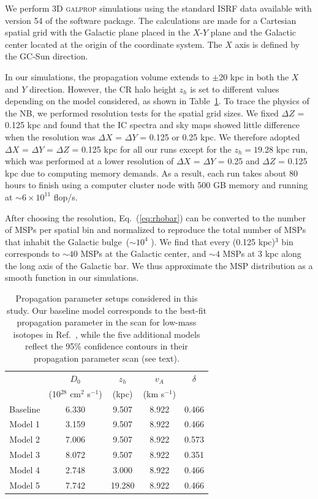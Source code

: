 \documentclass[doublespace,nopageskip]{VTthesis} %
\begin{document}
We perform 3D \textsc{galprop} simulations using the standard ISRF data available with version 54 of the software package. The calculations are made for a Cartesian spatial grid with the Galactic plane placed in the $X$-$Y$ plane and the Galactic center located at the origin of the coordinate system. The $X$ axis is defined by the GC-Sun direction.

In our simulations, the propagation volume extends to $\pm$20 kpc in both the $X$ and $Y$ direction. However, the CR halo height $z_h$ is set to different values depending on the model considered, as shown in Table~\ref{tab:dpara}. To trace the physics of the NB, we performed resolution tests for the spatial grid sizes. We fixed $\Delta Z$ = 0.125 kpc and found that the IC spectra and sky maps showed little difference when the resolution was $\Delta X$ = $\Delta Y$ = 0.125 or 0.25 kpc. We therefore adopted $\Delta X$ = $\Delta Y$ = $\Delta Z$ = 0.125 kpc for all our runs except for the $z_h = 19.28$ kpc run, which was performed at a lower resolution of $\Delta X$ = $\Delta Y$ = 0.25 and $\Delta Z$ = 0.125 kpc due to computing memory demands. As a result, each run takes about 80 hours to finish using a computer cluster node with 500 GB memory and running at $\sim 6 \times 10^{11}$ flop/s.

After choosing the resolution, Eq.~(\ref{eq:rhobar}) can be converted to the number of MSPs per spatial bin and normalized to reproduce the total number of MSPs that inhabit the Galactic bulge~($\sim 10^4$ \cite{2018ApJ...863..199G}). We find that every (0.125 kpc)$^3$ bin corresponds to $\sim 40$ MSPs at the Galactic center, and $\sim 4$ MSPs at 3 kpc along the long axis of the Galactic bar. We thus approximate the MSP distribution as a smooth function in our simulations.

\begin{table}[htb]
  \centering
  \caption{Propagation parameter setups considered in this study. Our baseline model corresponds to the best-fit propagation parameter in the scan for low-mass isotopes in Ref.~\cite{2016ApJ...824...16J}, while the five additional models reflect the 95\% confidence contours in their propagation parameter scan \cite{2016ApJ...824...16J} (see text).}
    \begin{tabular}{ c c c c c }
    \toprule
      & $D_0$ & $z_h$ & $v_A$  &$\delta$ \\
      & (10$^{28}$ cm$^2$ s$^{-1}$) & (kpc) & (km s$^{-1}$) & \\ 
      \midrule
      Baseline & 6.330 & 9.507 & 8.922 & 0.466 \\
      Model 1 & 3.159 & 9.507 & 8.922 & 0.466 \\
      Model 2 & 7.006 & 9.507 & 8.922 & 0.573 \\
      Model 3 & 8.072 & 9.507 & 8.922 & 0.351 \\
      Model 4 & 2.748 & 3.000 & 8.922 & 0.466 \\
      Model 5 & 7.742 & 19.280 & 8.922 & 0.466 \\
      \bottomrule
    \end{tabular}
\label{tab:dpara}
\end{table}
\end{document}
